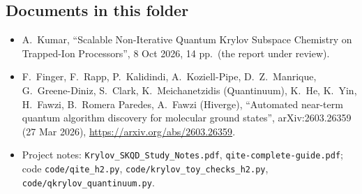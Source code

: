 \documentclass[11pt,a4paper]{article}
\begin{document}
\subsection*{Documents in this folder}
\begin{itemize}\small\sloppy
\item A.~Kumar, ``Scalable Non-Iterative Quantum Krylov Subspace Chemistry on Trapped-Ion Processors'', 8 Oct 2026, 14 pp.\ (the report under review).
\item F.~Finger, F.~Rapp, P.~Kalidindi, A.~Koziell-Pipe, D.~Z.~Manrique, G.~Greene-Diniz, S.~Clark, K.~Meichanetzidis (Quantinuum), K.~He, K.~Yin, H.~Fawzi, B.~Romera Paredes, A.~Fawzi (Hiverge), ``Automated near-term quantum algorithm discovery for molecular ground states'', arXiv:2603.26359 (27 Mar 2026), \url{https://arxiv.org/abs/2603.26359}.
\item Project notes: \texttt{Krylov\_SKQD\_Study\_Notes.pdf}, \texttt{qite-complete-guide.pdf}; code \texttt{code/qite\_h2.py}, \texttt{code/krylov\_toy\_checks\_h2.py}, \texttt{code/qkrylov\_quantinuum.py}.
\end{itemize}
\end{document}

